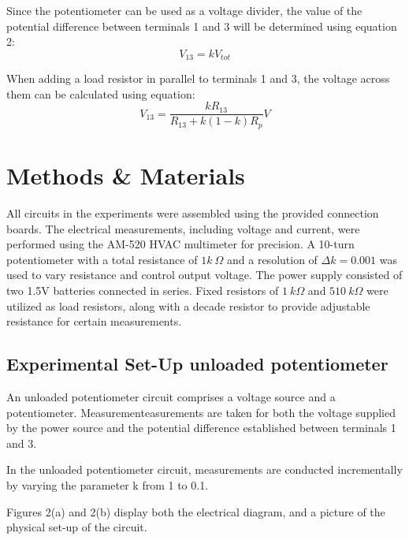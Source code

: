 \documentclass[a4paper]{article}
\begin{document}
Since the potentiometer can be used as a voltage divider, the value of the
potential difference between terminals 1 and 3 will be determined using equation 2:
\begin{equation}
    V_{13} = k V_{tot}
\end{equation} 

When adding a load resistor in parallel to terminals 1 and 3, the voltage across
them can be calculated using equation:
\begin{equation}
    V_{13} = \frac{kR_{13}}{R_{13}+k(1-k)R_p} V
\end{equation}
\section{Methods \& Materials}
All circuits in the experiments were assembled using the provided connection boards. 
The electrical measurements, including voltage and current, were performed using the AM-520 
HVAC multimeter for precision. 
A 10-turn potentiometer with a total resistance of $1 k~\Omega$ and a resolution of $\Delta k = 0.001$ 
was used to vary resistance and control output voltage. 
The power supply consisted of two 1.5V batteries connected in series. 
Fixed resistors of $1 ~k\Omega$  and $510 ~k\Omega$  were utilized as load resistors, 
along with a decade resistor to provide 
adjustable resistance for certain measurements.


\newpage
\subsection{Experimental Set-Up unloaded potentiometer}
An unloaded potentiometer circuit comprises a voltage source and a potentiometer.
Measurementeasurements are taken for both the voltage supplied by the power source
and the potential difference established between terminals 1 and 3. 

In the unloaded potentiometer circuit, measurements are conducted incrementally by varying the parameter 
k from 1 to 0.1. 

Figures 2(a) and 2(b) display both
the electrical diagram, and a picture of the physical set-up of the circuit.
\end{document}
